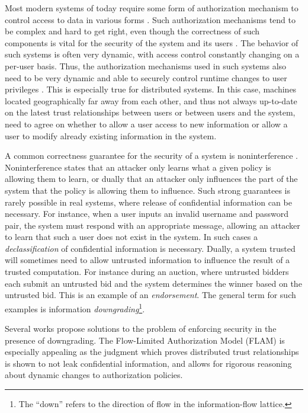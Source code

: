 Most modern systems of today require some form of authorization mechanism to control access to data in various forms \cite{Menezes:1996:HAC:548089}. Such authorization mechanisms tend to be complex and hard to get right, even though the correctness of such components is vital for the security of the system and its users \cite{Ferraiolo:1999:RAC:300830.300834}. The behavior of such systems is often very dynamic, with access control constantly changing on a per-user basis. Thus, the authorization mechanisms used in such systems also need to be very dynamic and able to securely control runtime changes to user privileges \cite{Ferraiolo:1999:RAC:300830.300834}.
This is especially true for distributed systems. In this case, machines located geographically far away from each other, and thus not always up-to-date on the latest trust relationships between users or between users and the system, need to agree on whether to allow a user access to new information or allow a user to modify already existing information in the system.

A common correctness guarantee for the security of a system is noninterference \cite{6234468}. Noninterference states that an attacker only learns what a given policy is allowing them to learn, or dually that an attacker only influences the part of the system that the policy is allowing them to influence. Such strong guarantees is rarely possible in real systems, where release of confidential information can be necessary. For instance, when a user inputs an invalid username and password pair, the system must respond with an appropriate message, allowing an attacker to learn that such a user does not exist in the system. In such cases a \emph{declassification} of confidential information is necessary. Dually, a system trusted will sometimes need to allow untrusted information to influence the result of a trusted computation. For instance during an auction, where untrusted bidders each submit an untrusted bid and the system determines the winner based on the untrusted bid. This is an example of an \emph{endorsement}. The general term for such examples is information \emph{downgrading}\footnote{The ``down'' refers to the direction of flow in the information-flow lattice.}.

Several works \cite{Efstathopoulos:2005:LEP:1095810.1095813, Krohn:2007:IFC:1294261.1294293, Arden:2015:FA:2859845.2859998, Hicks05dynamicupdating} propose solutions to the problem of enforcing security in the presence of downgrading. The Flow-Limited Authorization Model (FLAM) \cite{Arden:2015:FA:2859845.2859998} is especially appealing as the judgment which proves distributed trust relationships is shown to not leak confidential information, and allows for rigorous reasoning about dynamic changes to authorization policies.

